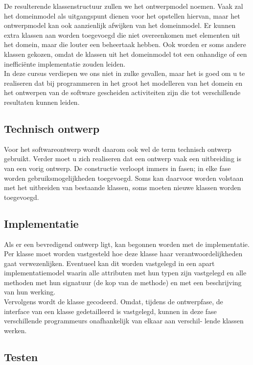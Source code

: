 \documentclass{article}
\begin{document}
	De resulterende klassenstructuur zullen we het ontwerpmodel noemen. Vaak zal het domeinmodel als uitgangspunt dienen voor het opstellen hiervan, maar het ontwerpmodel kan ook aanzienlijk	afwijken van het domeinmodel. Er kunnen extra klassen aan worden
	toegevoegd die niet overeenkomen met elementen uit het domein, maar	die louter een beheertaak hebben. Ook worden er soms andere klassen gekozen, omdat de klassen uit het domeinmodel tot een onhandige of een inefficiënte implementatie zouden leiden. \\
	In deze cursus verdiepen we ons niet in zulke gevallen, maar het is goed om u te realiseren dat bij programmeren in het groot het modelleren van het domein en het ontwerpen van de software gescheiden activiteiten zijn die tot verschillende resultaten kunnen leiden. \\
	
	\subsection{Technisch ontwerp}
	
	Voor het softwareontwerp wordt daarom ook wel de term technisch ontwerp gebruikt.
	Verder moet u zich realiseren dat een ontwerp vaak een uitbreiding is
	van een vorig ontwerp. De constructie verloopt immers in fasen; in elke
	fase worden gebruiksmogelijkheden toegevoegd. Soms kan daarvoor
	worden volstaan met het uitbreiden van bestaande klassen, soms moeten
	nieuwe klassen worden toegevoegd.
	
	\subsection{Implementatie}
	
	Als er een bevredigend ontwerp ligt, kan begonnen worden met de
	implementatie. Per klasse moet worden vastgesteld hoe deze klasse haar
	verantwoordelijkheden gaat verwezenlijken. Eventueel kan dit worden
	vastgelegd in een apart implementatiemodel waarin alle attributen met
	hun typen zijn vastgelegd en alle methoden met hun signatuur (de kop
	van de methode) en met een beschrijving van hun werking. \\
	Vervolgens wordt de klasse gecodeerd. Omdat, tijdens de ontwerpfase,
	de interface van een klasse gedetailleerd is vastgelegd, kunnen in deze
	fase verschillende programmeurs onafhankelijk van elkaar aan verschil-
	lende klassen werken.
	
	\subsection{Testen}
	
\end{document}
